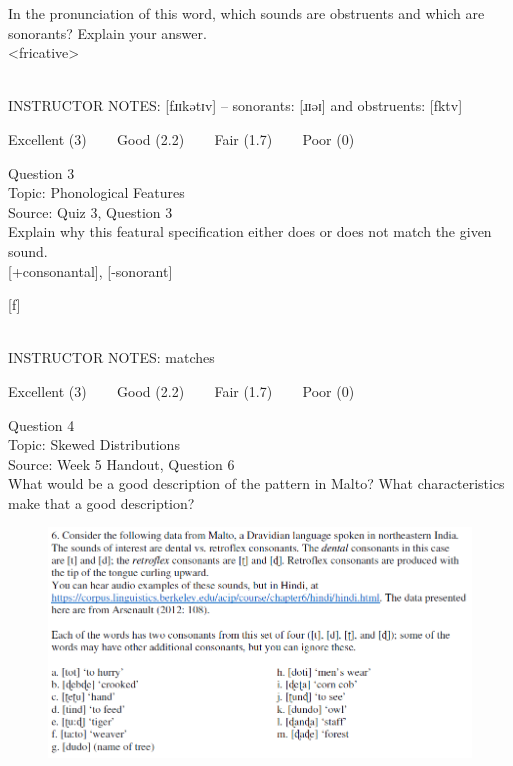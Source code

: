 \documentclass[12pt]{article}
\begin{document}
In the pronunciation of this word, which sounds are obstruents and which are sonorants? Explain your answer.\\

<fricative>


~\\
INSTRUCTOR NOTES: [fɹɪkətɪv] -- sonorants: [ɹɪəɪ] and obstruents: [fktv]


\vfill
Excellent (3) ~~~ Good (2.2) ~~~ Fair (1.7) ~~~ Poor (0)
\newpage

{\large Question 3}\\

Topic: Phonological Features\\
Source: Quiz 3, Question 3\\

Explain why this featural specification either does or does not match the given sound.\\

{[+consonantal]}, {[-sonorant]}

{[f]}


~\\
INSTRUCTOR NOTES: matches


\vfill
Excellent (3) ~~~ Good (2.2) ~~~ Fair (1.7) ~~~ Poor (0)
\newpage

{\large Question 4}\\

Topic: Skewed Distributions\\
Source: Week 5 Handout, Question 6\\

What would be a good description of the pattern in Malto? What characteristics make that a good description?\\

\begin{figure}[H]
\includegraphics{../images/malto.png}
\end{figure}
\end{document}

